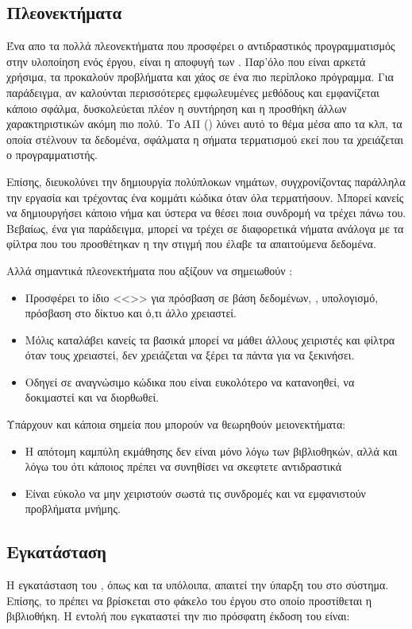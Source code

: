 \subsection*{Πλεονεκτήματα}
\quad Ένα απο τα πολλά πλεονεκτήματα που προσφέρει ο αντιδραστικός προγραμματισμός στην υλοποίηση ενός έργου, είναι η αποφυγή των . Παρ'όλο που είναι αρκετά χρήσιμα, τα  προκαλούν προβλήματα και χάος σε ένα πιο περίπλοκο πρόγραμμα. Για παράδειγμα, αν καλούνται περισσότερες εμφωλευμένες μεθόδους και εμφανίζεται κάποιο σφάλμα, δυσκολεύεται πλέον η συντήρηση και η προσθήκη άλλων χαρακτηριστικών ακόμη πιο πολύ. Το ΑΠ () λύνει αυτό το θέμα μέσα απο τα  κλπ, τα οποία στέλνουν τα δεδομένα, σφάλματα η σήματα τερματισμού εκεί που τα χρειάζεται ο προγραμματιστής.\par
Επίσης, διευκολύνει την δημιουργία πολύπλοκων νημάτων, συγχρονίζοντας παράλληλα την εργασία και τρέχοντας ένα κομμάτι κώδικα όταν όλα τερματήσουν. Μπορεί κανείς να δημιουργήσει κάποιο νήμα και ύστερα να θέσει ποια συνδρομή να τρέχει πάνω του. Βεβαίως, ένα  για παράδειγμα, μπορεί να τρέχει σε διαφορετικά νήματα ανάλογα με τα φίλτρα που του προσθέτηκαν η την στιγμή που έλαβε τα απαιτούμενα δεδομένα.\par
Αλλά σημαντικά πλεονεκτήματα που αξίζουν να σημειωθούν : 
\begin{itemize}
    \item Προσφέρει το ίδιο <<>> για πρόσβαση σε βάση δεδομένων, , υπολογισμό, πρόσβαση στο δίκτυο και ό,τι άλλο χρειαστεί.
    \item Μόλις καταλάβει κανείς τα βασικά μπορεί να μάθει άλλους χειριστές και φίλτρα όταν τους χρειαστεί, δεν χρειάζεται να ξέρει τα πάντα για να ξεκινήσει.
    \item Οδηγεί σε αναγνώσιμο κώδικα που είναι ευκολότερο να κατανοηθεί, να δοκιμαστεί και να διορθωθεί.
\end{itemize}
Υπάρχουν και κάποια σημεία που μπορούν να θεωρηθούν μειονεκτήματα:
\begin{itemize}
    \item Η απότομη καμπύλη εκμάθησης δεν είναι μόνο λόγω των βιβλιοθηκών, αλλά και λόγω του ότι κάποιος πρέπει να συνηθίσει να σκεφτετε αντιδραστικά
    \item Είναι εύκολο να μην χειριστούν σωστά τις συνδρομές και να εμφανιστούν προβλήματα μνήμης.
\end{itemize}

\subsection*{Εγκατάσταση}
\quad Η εγκατάσταση του , όπως και τα υπόλοιπα, απαιτεί την ύπαρξη του  στο σύστημα. Επίσης, το  πρέπει να βρίσκεται στο φάκελο του έργου στο οποίο προστίθεται η βιβλιοθήκη. Η εντολή που εγκαταστεί την πιο πρόσφατη έκδοση του  είναι:

